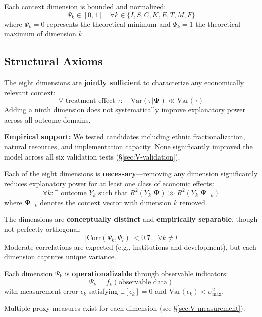 \begin{axiom}
\label{ax:psi-bound}
Each context dimension is bounded and normalized:
\[
\Psi_k \in [0,1] \quad \forall k \in \{I, S, C, K, E, T, M, F\}
\]
where $\Psi_k = 0$ represents the theoretical minimum and $\Psi_k = 1$ 
the theoretical maximum of dimension $k$.
\end{axiom}

\subsection{Structural Axioms}

\begin{axiom}
\label{ax:psi-complete}
The eight dimensions are \textbf{jointly sufficient} to characterize any 
economically relevant context:
\[
\forall \text{ treatment effect } \tau: \quad 
\text{Var}(\tau | \boldsymbol{\Psi}) \ll \text{Var}(\tau)
\]
Adding a ninth dimension does not systematically improve explanatory power 
across all outcome domains.

\textbf{Empirical support:} We tested candidates including ethnic fractionalization, 
natural resources, and implementation capacity. None significantly improved 
the model across all six validation tests (\S\ref{sec:V-validation}).
\end{axiom}

\begin{axiom}
\label{ax:psi-necessary}
Each of the eight dimensions is \textbf{necessary}---removing any dimension 
significantly reduces explanatory power for at least one class of economic effects:
\[
\forall k: \exists \text{ outcome } Y_k \text{ such that } 
R^2(Y_k | \boldsymbol{\Psi}) \gg R^2(Y_k | \boldsymbol{\Psi}_{-k})
\]
where $\boldsymbol{\Psi}_{-k}$ denotes the context vector with dimension $k$ removed.
\end{axiom}

\begin{axiom}
\label{ax:psi-orth}
The dimensions are \textbf{conceptually distinct} and \textbf{empirically 
separable}, though not perfectly orthogonal:
\[
|\text{Corr}(\Psi_k, \Psi_l)| < 0.7 \quad \forall k \neq l
\]
Moderate correlations are expected (e.g., institutions and development), 
but each dimension captures unique variance.
\end{axiom}

\begin{axiom}
\label{ax:psi-meas}
Each dimension $\Psi_k$ is \textbf{operationalizable} through observable 
indicators:
\[
\Psi_k = f_k(\text{observable data})
\]
with measurement error $\epsilon_k$ satisfying $\mathbb{E}[\epsilon_k] = 0$ 
and $\text{Var}(\epsilon_k) < \sigma^2_{\max}$.

Multiple proxy measures exist for each dimension (see \S\ref{sec:V-measurement}).
\end{axiom}

